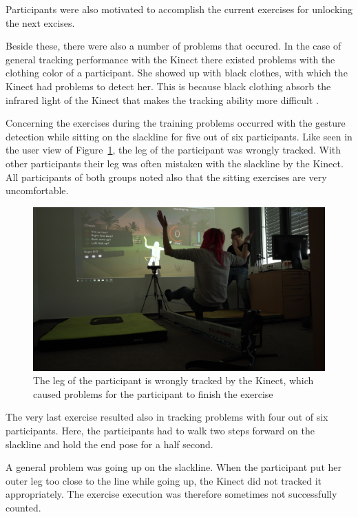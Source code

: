 Participants were also motivated to accomplish the current exercises for unlocking the next excises.

Beside these, there were also a number of problems that occured.
In the case of general tracking performance with the Kinect there existed problems with the clothing color of a participant.
She showed up with black clothes, with which the Kinect had problems to detect her.
This is because black clothing absorb the infrared light of the Kinect that makes the tracking ability more difficult \cite{KinectBlackClothing}.

Concerning the exercises during the training problems occurred with the gesture detection while sitting on the slackline for five out of six participants.
Like seen in the user view of Figure~\ref{fig:6_5_sittingProblems}, the leg of the participant was wrongly tracked.
With other participants their leg was often mistaken with the slackline by the Kinect.
All participants of both groups noted also that the sitting exercises are very uncomfortable.
\begin{figure}[htb]
	\centering
	\includegraphics[width=0.97\linewidth]{Pictures/6_5_sitting}
	\caption{The leg of the participant is wrongly tracked by the Kinect, which caused problems for the participant to finish the exercise}
	\label{fig:6_5_sittingProblems}
\end{figure}

The very last exercise resulted also in tracking problems with four out of six participants.
Here, the participants had to walk two steps forward on the slackline and hold the end pose for a half second.

A general problem was going up on the slackline.
When the participant put her outer leg too close to the line while going up, the Kinect did not tracked it appropriately.
The exercise execution was therefore sometimes not successfully counted.

